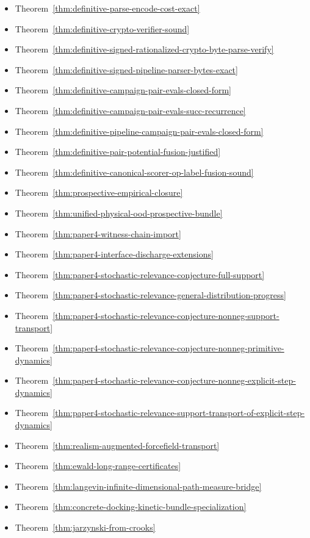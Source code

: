\begin{itemize}
\item Theorem~\ref{thm:definitive-parse-encode-cost-exact}
\item Theorem~\ref{thm:definitive-crypto-verifier-sound}
\item Theorem~\ref{thm:definitive-signed-rationalized-crypto-byte-parse-verify}
\item Theorem~\ref{thm:definitive-signed-pipeline-parser-bytes-exact}
\item Theorem~\ref{thm:definitive-campaign-pair-evals-closed-form}
\item Theorem~\ref{thm:definitive-campaign-pair-evals-succ-recurrence}
\item Theorem~\ref{thm:definitive-pipeline-campaign-pair-evals-closed-form}
\item Theorem~\ref{thm:definitive-pair-potential-fusion-justified}
\item Theorem~\ref{thm:definitive-canonical-scorer-op-label-fusion-sound}
\item Theorem~\ref{thm:prospective-empirical-closure}
\item Theorem~\ref{thm:unified-physical-ood-prospective-bundle}
\item Theorem~\ref{thm:paper4-witness-chain-import}
\item Theorem~\ref{thm:paper4-interface-discharge-extensions}
\item Theorem~\ref{thm:paper4-stochastic-relevance-conjecture-full-support}
\item Theorem~\ref{thm:paper4-stochastic-relevance-general-distribution-progress}
\item Theorem~\ref{thm:paper4-stochastic-relevance-conjecture-nonneg-support-transport}
\item Theorem~\ref{thm:paper4-stochastic-relevance-conjecture-nonneg-primitive-dynamics}
\item Theorem~\ref{thm:paper4-stochastic-relevance-conjecture-nonneg-explicit-step-dynamics}
\item Theorem~\ref{thm:paper4-stochastic-relevance-support-transport-of-explicit-step-dynamics}
\item Theorem~\ref{thm:realism-augmented-forcefield-transport}
\item Theorem~\ref{thm:ewald-long-range-certificates}
\item Theorem~\ref{thm:langevin-infinite-dimensional-path-measure-bridge}
\item Theorem~\ref{thm:concrete-docking-kinetic-bundle-specialization}
\item Theorem~\ref{thm:jarzynski-from-crooks}

\end{itemize}
